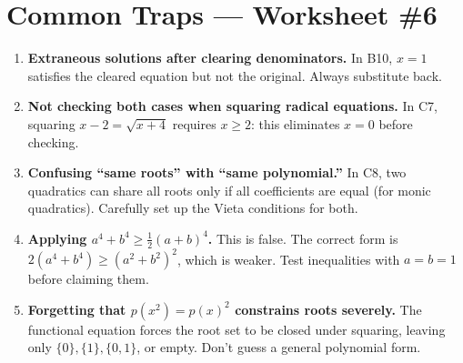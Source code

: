 \documentclass[11pt,a4paper]{article}
\begin{document}
\section*{Common Traps --- Worksheet \#6}
\begin{enumerate}[leftmargin=2em,itemsep=4pt]
  \item \textbf{Extraneous solutions after clearing denominators.} In B10, $x=1$ satisfies the cleared equation but not the original. Always substitute back. 
  \item \textbf{Not checking both cases when squaring radical equations.} In C7, squaring $x-2=\sqrt{x+4}$ requires $x\geq2$: this eliminates $x=0$ before checking. 
  \item \textbf{Confusing ``same roots'' with ``same polynomial.''} In C8, two quadratics can share all roots only if all coefficients are equal (for monic quadratics). Carefully set up the Vieta conditions for both. 
  \item \textbf{Applying $a^4+b^4\geq\frac{1}{2}(a+b)^4$.} This is false. The correct form is $2(a^4+b^4)\geq(a^2+b^2)^2$, which is weaker. Test inequalities with $a=b=1$ before claiming them. 
  \item \textbf{Forgetting that $p(x^2)=p(x)^2$ constrains roots severely.} The functional equation forces the root set to be closed under squaring, leaving only $\{0\},\{1\},\{0,1\}$, or empty. Don't guess a general polynomial form. 
\end{enumerate}

\end{document}

